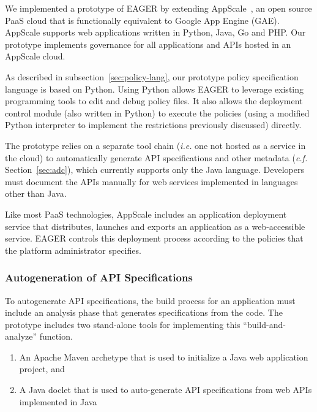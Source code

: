 We implemented a prototype of EAGER by extending AppScale~\cite{appscale13}, 
an open source PaaS cloud that is 
functionally equivalent to Google App Engine (GAE).  AppScale supports
web applications written in Python, Java, Go and PHP. Our prototype
implements governance for all applications and APIs hosted in an AppScale cloud. 

As described in subsection~\ref{sec:policy-lang}, 
our prototype policy specification
language is based on Python.
Using Python allows EAGER to leverage
existing programming tools to edit and debug policy files. 
It also allows the deployment control module (also written in Python) to
execute the policies (using a modified Python interpreter to implement the
restrictions previously discussed) directly.


The prototype relies on a separate tool chain ({\em i.e.} one not hosted as a
service in the cloud) to automatically generate
API specifications and other metadata ({\em c.f.} Section~\ref{sec:adc}), which
currently supports only the Java language.  
Developers must document the APIs manually
for web services implemented in languages other than Java.

Like most PaaS technologies, AppScale includes an application deployment
service that distributes, launches and exports an application
as a web-accessible service.  EAGER controls this deployment
process according to the policies that the platform administrator specifies.

\subsubsection{Autogeneration of API Specifications}
To autogenerate API specifications, the build process for an application must
include an analysis phase that generates specifications from the code.
The prototype includes two stand-alone tools for implementing this
``build-and-analyze'' function.
\begin{enumerate}
\vspace{0.05in}
\item An Apache Maven archetype that is used to initialize a Java
web application project, and 
\vspace{0.05in}
\item A Java doclet that is used to auto-generate API specifications from web APIs implemented in Java
\vspace{0.05in}
\end{enumerate}


